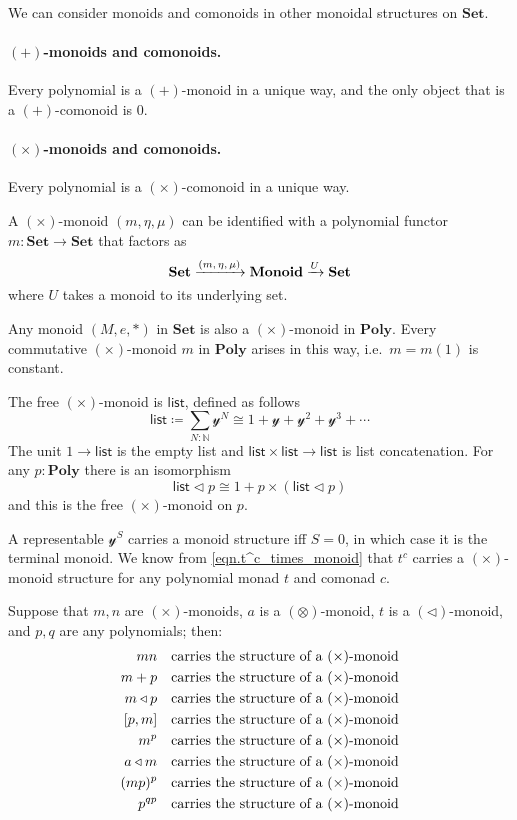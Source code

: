 \documentclass[11pt, one side, article]{memoir}
\theoremstyle{definition}
\theoremstyle{plain}
\newcommand{\Cat}[1]{\mathbf{#1}}%
\newcommand{\Fun}[1]{\mathsf{#1}}%
\newcommand{\To}[2][]{\xrightarrow[#1]{\tn{$#2$}}}
\newcommand{\tn}[1]{\textnormal{#1}}
\newcommand{\nn}{\mathbb{N}}
\newcommand{\smset}{\Cat{Set}}
\newcommand{\List}{\Fun{list}}
\newcommand{\yon}{{\mathcal{y}}}
\newcommand{\poly}{\Cat{Poly}}
\newcommand{\0}{\textsf{0}}
\newcommand{\1}{\tn{\textsf{1}}}
\newcommand{\tri}{\mathbin{\triangleleft}}
\newcommand{\uu}{\List}
\begin{document}
We can consider monoids and comonoids in other monoidal structures on $\smset$. 

\paragraph{$(+)$-monoids and comonoids.}
Every polynomial is a $(+)$-monoid in a unique way, and the only object that is a $(+)$-comonoid is $0$.

\paragraph{$(\times)$-monoids and comonoids.}
Every polynomial is a $(\times)$-comonoid in a unique way.

A $(\times)$-monoid $(m,\eta,\mu)$ can be identified with a polynomial functor $m\colon\smset\to\smset$ that factors as
\begin{equation}
	\smset\To{(m,\eta,\mu)}\Cat{Monoid}\To{U}\smset
\end{equation}
where $U$ takes a monoid to its underlying set.

Any monoid $(M,e,*)$ in $\smset$ is also a $(\times)$-monoid in $\poly$. Every commutative $(\times)$-monoid $m$ in $\poly$ arises in this way, i.e.\ $m=m(1)$ is constant.

The free $(\times)$-monoid is $\uu$, defined as follows
\begin{equation}\label{eqn.list}
\uu\coloneqq\sum_{N:\nn}\yon^N\cong 1+\yon+\yon^2+\yon^3+\cdots
\end{equation}
The unit $1\to\uu$ is the empty list and $\uu\times\uu\to\uu$ is list concatenation. For any $p:\poly$ there is an isomorphism
\begin{equation}\label{eqn.unfolding_list}
\uu\tri p\cong 1+p\times(\uu\tri p)
\end{equation}
and this is the free $(\times)$-monoid on $p$.

A representable $\yon^S$ carries a monoid structure iff $S=0$, in which case it is the terminal monoid. We know from \eqref{eqn.t^c_times_monoid} that $t^c$ carries a $(\times)$-monoid structure for any polynomial monad $t$ and comonad $c$.

Suppose that $m,n$ are $(\times)$-monoids, $a$ is a $(\otimes)$-monoid, $t$ is a $(\tri)$-monoid, and $p, q$ are any polynomials; then:
\begin{align}
	mn&\quad\tn{carries the structure of a $(\times)$-monoid}\\
	m+p&\quad\tn{carries the structure of a $(\times)$-monoid}\\
	m\tri p&\quad\tn{carries the structure of a $(\times)$-monoid}\\
	[p,m]&\quad\tn{carries the structure of a $(\times)$-monoid}\\
	m^p&\quad\tn{carries the structure of a $(\times)$-monoid}\\
	a\tri m&\quad\tn{carries the structure of a $(\times)$-monoid}\\
	(mp)^p&\quad\tn{carries the structure of a $(\times)$-monoid}\\
	p^{qp}&\quad\tn{carries the structure of a $(\times)$-monoid}
\end{align}
\
\end{document}
